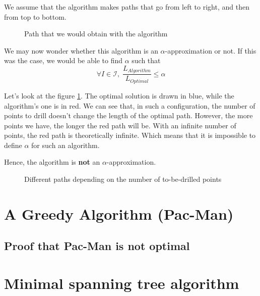 \documentclass[11pt]{article}
\begin{document}
We assume that the algorithm makes paths that go from left to right, and then from top to bottom.

\begin{figure}[h!]
	\centering
	\caption{Path that we would obtain with the algorithm}
\end{figure}

We may now wonder whether this algorithm is an $\alpha$-approximation or not. If this was the case, we would be able to find $\alpha$ such that
\[
	\forall I \in \mathcal{I}, \; \frac{{L}_{Algorithm}}{{L}_{Optimal}} \leq \alpha
\]

Let's look at the figure \ref{fig:counter-example}. The optimal solution is drawn in \textcolor{myblue}{blue}, while the algorithm's one
is in \textcolor{myred}{red}. We can see that, in such a configuration, the number of points to drill doesn't change the length of the
optimal path. However, the more points we have, the longer the red path will be. With an infinite number of points, the red path
is theoretically infinite. Which means that it is impossible to define $\alpha$ for such an algorithm.

Hence, the algorithm is \textbf{not} an $\alpha$-approximation.


\begin{figure}
        \centering
        \begin{subfigure}[b]{0.2\textwidth}
        \end{subfigure}
		\hfill
        \begin{subfigure}[b]{0.2\textwidth}
        \end{subfigure}
		\hfill
        \begin{subfigure}[b]{0.2\textwidth}
        \end{subfigure}
        \caption{Different paths depending on the number of to-be-drilled points}
		\label{fig:counter-example}
\end{figure}


\section{A Greedy Algorithm (Pac-Man)}
\subsection{Proof that Pac-Man is not optimal}

\section{Minimal spanning tree algorithm}
\end{document}
